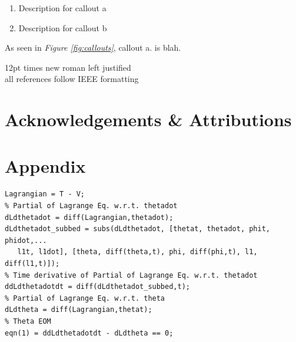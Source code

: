\documentclass[12pt]{report}
\renewcommand\thesection{\arabic{section}}
\begin{document}
\begin{enumerate}[label=\alph*.]
  \item Description for callout a
  \item Description for callout b
\end{enumerate}

As seen in \emph{Figure \ref{fig:callouts}}, callout a. is blah. \\
\blindtext

\newpage


\vspace{2ex}

\color{red}
12pt times new roman left justified \\
all references follow IEEE formatting
\color{black}

\newpage
\section*{Acknowledgements \& Attributions}
\blinditemize
\newpage

\newpage
\appendix
\renewcommand\thesection{\Roman{section}}
\renewcommand\thesubsection{\roman{subsection}}
\section*{Appendix}\label{sec:app}
\begin{lstlisting}[frame=lines,style=Matlab-editor,basicstyle = \mlttfamily, caption=Example Code Listing]
Lagrangian = T - V;
% Partial of Lagrange Eq. w.r.t. thetadot
dLdthetadot = diff(Lagrangian,thetadot);
dLdthetadot_subbed = subs(dLdthetadot, [thetat, thetadot, phit, phidot,...
   l1t, l1dot], [theta, diff(theta,t), phi, diff(phi,t), l1, diff(l1,t)]);
% Time derivative of Partial of Lagrange Eq. w.r.t. thetadot
ddLdthetadotdt = diff(dLdthetadot_subbed,t);
% Partial of Lagrange Eq. w.r.t. theta
dLdtheta = diff(Lagrangian,thetat);
% Theta EOM
eqn(1) = ddLdthetadotdt - dLdtheta == 0;
\end{lstlisting}


\end{document}
